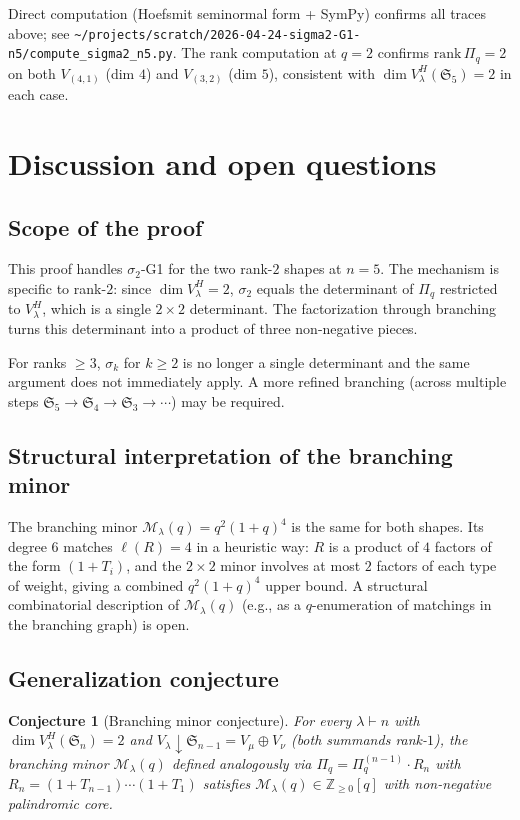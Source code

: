 \documentclass[11pt]{article}
\theoremstyle{plain}
\newtheorem{conjecture}[theorem]{Conjecture}
\theoremstyle{definition}
\theoremstyle{remark}
\newcommand{\Z}{\mathbb{Z}}
\newcommand{\Sym}{\mathfrak{S}}
\newcommand{\Pibs}{\Pi_q}
\begin{document}
Direct computation (Hoefsmit seminormal form + SymPy) confirms all traces above;
see \texttt{\textasciitilde/projects/scratch/2026-04-24-sigma2-G1-n5/compute\_sigma2\_n5.py}.
The rank computation at $q = 2$ confirms $\mathrm{rank}\,\Pibs = 2$ on both
$V_{(4,1)}$ (dim $4$) and $V_{(3,2)}$ (dim $5$), consistent with
$\dim V_\lambda^H(\Sym_5) = 2$ in each case.

\section{Discussion and open questions}

\subsection*{Scope of the proof}

This proof handles $\sigma_2$-G1 for the two rank-$2$ shapes at $n = 5$.
The mechanism is specific to rank-$2$: since $\dim V_\lambda^H = 2$,
$\sigma_2$ equals the determinant of $\Pibs$ restricted to $V_\lambda^H$, which
is a single $2 \times 2$ determinant. The factorization through branching turns
this determinant into a product of three non-negative pieces.

For ranks $\geq 3$, $\sigma_k$ for $k \geq 2$ is no longer a single determinant
and the same argument does not immediately apply. A more refined branching (across
multiple steps $\Sym_5 \to \Sym_4 \to \Sym_3 \to \cdots$) may be required.

\subsection*{Structural interpretation of the branching minor}

The branching minor $\mathcal{M}_\lambda(q) = q^2(1+q)^4$ is the same for both
shapes. Its degree $6$ matches $\ell(R) = 4$ in a heuristic way: $R$ is a product
of $4$ factors of the form $(1 + T_i)$, and the $2 \times 2$ minor involves at most
$2$ factors of each type of weight, giving a combined $q^2(1+q)^4$ upper bound.
A structural combinatorial description of $\mathcal{M}_\lambda(q)$ (e.g., as a
$q$-enumeration of matchings in the branching graph) is open.

\subsection*{Generalization conjecture}

\begin{conjecture}[Branching minor conjecture]\label{conj:minor}
For every $\lambda \vdash n$ with $\dim V_\lambda^H(\Sym_n) = 2$ and
$V_\lambda \downarrow \Sym_{n-1} = V_\mu \oplus V_\nu$ (both summands rank-$1$),
the branching minor $\mathcal{M}_\lambda(q)$ defined analogously via
$\Pibs = \Pibs^{(n-1)} \cdot R_n$ with $R_n = (1+T_{n-1}) \cdots (1+T_1)$ satisfies
$\mathcal{M}_\lambda(q) \in \Z_{\geq 0}[q]$ with non-negative palindromic core.
\end{conjecture}
\end{document}

